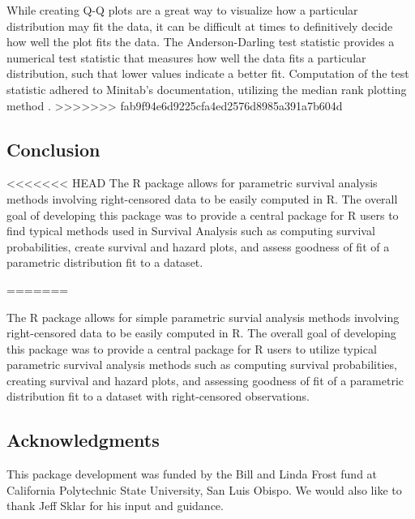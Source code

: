 While creating Q-Q plots are a great way to visualize how a particular
distribution may fit the data, it can be difficult at times to
definitively decide how well the plot fits the data. The
Anderson-Darling test statistic provides a numerical test statistic that
measures how well the data fits a particular distribution, such that
lower values indicate a better fit. Computation of the test statistic
adhered to Minitab's documentation, utilizing the median rank plotting
method \citep{Minitabgof}.
\textgreater{}\textgreater{}\textgreater{}\textgreater{}\textgreater{}\textgreater{}\textgreater{}
fab9f94e6d9225cfa4ed2576d8985a391a7b604d

\hypertarget{conclusion}{%
\subsection{Conclusion}\label{conclusion}}

\textless{}\textless{}\textless{}\textless{}\textless{}\textless{}\textless{}
HEAD The R package  allows for parametric survival
analysis methods involving right-censored data to be easily computed in
R. The overall goal of developing this package was to provide a central
package for R users to find typical methods used in Survival Analysis
such as computing survival probabilities, create survival and hazard
plots, and assess goodness of fit of a parametric distribution fit to a
dataset.



=======

The R package  allows for simple parametric survial
analysis methods involving right-censored data to be easily computed in
R. The overall goal of developing this package was to provide a central
package for R users to utilize typical parametric survival analysis
methods such as computing survival probabilities, creating survival and
hazard plots, and assessing goodness of fit of a parametric distribution
fit to a dataset with right-censored observations.

\hypertarget{acknowledgments}{%
\subsection{Acknowledgments}\label{acknowledgments}}

This package development was funded by the Bill and Linda Frost fund at
California Polytechnic State University, San Luis Obispo. We would also
like to thank Jeff Sklar for his input and guidance.

